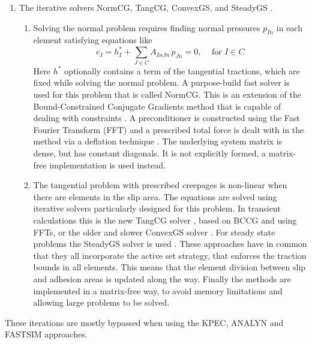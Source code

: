 \documentclass[12pt]{report}
\begin{document}
\begin{enumerate}
\item\label{itm:it_solvers} The iterative solvers NormCG, TangCG, 
        ConvexGS, and SteadyGS \cite{Vollebregt2014a-fftprec, 
        Zhao_Jing2015a-tangcg,Vollebregt1995a-convexgs,
        Vollebregt2010c-cst2010}.
\begin{enumerate}
\item Solving the normal problem requires finding normal pressures
        $p_{In}$ in each element satisfying equations like
        \begin{equation}
         e_I = h^*_I + \sum_{J\in C} A_{InJn} \, p_{Jn} = 0,
                                        \;\;\;\mbox{ for } I\in C
        \end{equation}
        Here $h^*$ optionally contains a term of the tangential tractions,
        which are fixed while solving the normal problem. A purpose-build
        fast solver is used for this problem that is called NormCG.
        This is an extension of the Bound-Constrained Conjugate Gradients
        method that is capable of dealing with constraints
        \cite{Vollebregt2014b-bccg}. A preconditioner is constructed using
        the Fast Fourier Transform (FFT) and a prescribed total force is
        dealt with in the method via a deflation technique
        \cite{Vollebregt2014a-fftprec}.
        The underlying system matrix is dense, but has constant diagonals. It
        is not explicitly formed, a matrix-free implementation is used
        instead.
\item The tangential problem with prescribed creepages is non-linear when
        there are elements in the slip area. The equations are solved using
        iterative solvers particularly designed for this problem. In
        transient calculations this is the new TangCG solver
        \cite{Zhao_Jing2015a-tangcg}, based on BCCG and using FFTs, or the
        older and slower ConvexGS solver \cite{Vollebregt1995a-convexgs}.
        For steady state problems the SteadyGS solver is used 
        \cite{Vollebregt2010c-cst2010}. These approaches have in common
        that they all incorporate the active set strategy, that enforces
        the traction bounds in all elements. This means that the element
        division between slip and adhesion areas is updated along the way.
        Finally the methods are implemented in a matrix-free way, to avoid
        memory limitations and allowing large problems to be solved.
\end{enumerate}

\end{enumerate}
These iterations are mostly bypassed when using the KPEC, ANALYN and FASTSIM
approaches. 
\end{document}

